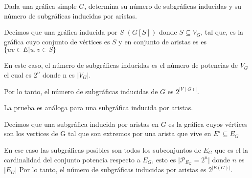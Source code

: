 Dada una gráfica simple $G$, determina su número de subgráficas inducidas y su número de subgráficas inducidas por aristas.

Decimos que una gráfica inducida por $S$ $\displaystyle (G\left[S\right])$ donde $S\subseteq V_G$, tal que, es la gráfica cuyo conjunto de vértices es $S$ y en conjunto de aristas es es $\{uv\in E\big| u,v\in S\}$

En este caso, el número de subgráficas inducidas es el número de potencias de $V_G$ el cual es $2^n$ donde n es $\big|V_G\big|$.

Por lo tanto, el número de subgráficas inducidas de $G$ es $2^{|V(G)|}$.

La prueba es análoga para una subgráfica inducida por aristas.

Decimos que una subgráfica inducida por aristas en $G$ es la gráfica cuyos vértices son los vertices de G tal que son extremos por una arista que vive en $E'\subseteq E_G$

En ese caso las subgráficas posibles son todos los subconjuntos de $E_G$ que es el la cardinalidad del conjunto potencia respecto a $E_G$, esto es $\big|\mathcal{P}_{E_G}=2^n\big|$ donde $n$ es $\big|E_G\big|$
Por lo tanto, el número de subgráficas inducidas por aristas es $2^{|E(G)|}$.
